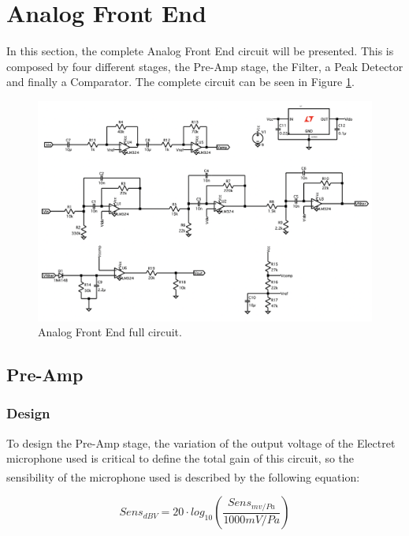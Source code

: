 \section{Analog Front End}

In this section, the complete Analog Front End circuit will be presented. This is composed by four different stages, the Pre-Amp stage, the Filter, a Peak Detector and finally a Comparator. The complete circuit can be seen in Figure \ref{fig:CompleteAFE}.

\begin{figure}[H]
    \centering
    \includegraphics*[scale = 0.45]{Images/CompleteAFE.png}
    \caption{Analog Front End full circuit.}
    \label{fig:CompleteAFE}
\end{figure}

\subsection{Pre-Amp}

\subsubsection{Design}

To design the Pre-Amp stage, the variation of the output voltage of the Electret microphone used is critical to define the total gain of this circuit, so the sensibility of the microphone used is described by the following equation\textsuperscript{\cite{Lab-statement}}:

\begin{equation}
    Sens_{dBV} = 20 \cdot log_{10} (\frac{Sens_{mv/Pa}}{1000mV/Pa})
    \label{eq:SensdBV}
\end{equation}

